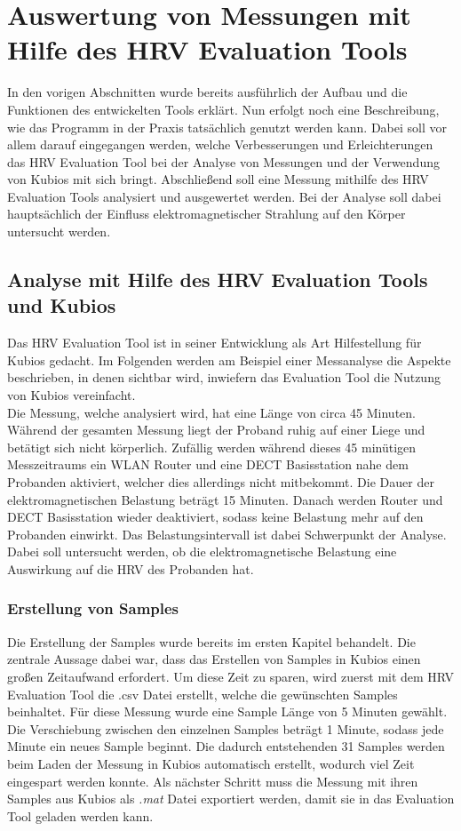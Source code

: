 
\chapter{Auswertung von Messungen mit Hilfe des HRV Evaluation Tools}
In den vorigen Abschnitten wurde bereits ausführlich der Aufbau und die Funktionen des entwickelten Tools erklärt. Nun erfolgt noch eine Beschreibung, wie das Programm in der Praxis tatsächlich genutzt werden kann. Dabei soll vor allem darauf eingegangen werden, welche Verbesserungen und Erleichterungen das HRV Evaluation Tool bei der Analyse von Messungen und der Verwendung von Kubios mit sich bringt. Abschließend soll eine Messung mithilfe des HRV Evaluation Tools analysiert und ausgewertet werden. Bei der Analyse soll dabei hauptsächlich der Einfluss elektromagnetischer Strahlung auf den Körper untersucht werden. 



\section{Analyse mit Hilfe des  HRV Evaluation Tools und Kubios}
Das HRV Evaluation Tool ist in seiner Entwicklung als Art Hilfestellung für Kubios gedacht. Im Folgenden werden am Beispiel einer Messanalyse die Aspekte beschrieben, in denen sichtbar wird, inwiefern das Evaluation Tool die Nutzung von Kubios vereinfacht.\\

Die Messung, welche analysiert wird, hat eine Länge von circa 45 Minuten. Während der gesamten Messung liegt der Proband ruhig auf einer Liege und betätigt sich nicht körperlich. Zufällig werden während dieses 45 minütigen Messzeitraums ein WLAN Router und eine DECT Basisstation nahe dem Probanden aktiviert, welcher dies allerdings nicht mitbekommt. Die Dauer der elektromagnetischen Belastung beträgt 15 Minuten. Danach werden Router und DECT Basisstation wieder deaktiviert, sodass keine Belastung mehr auf den Probanden einwirkt. Das Belastungsintervall ist dabei Schwerpunkt der Analyse. Dabei soll untersucht werden, ob die elektromagnetische Belastung eine Auswirkung auf die HRV des Probanden hat.

\subsection{Erstellung von Samples}
Die Erstellung der Samples wurde bereits im ersten Kapitel behandelt. Die zentrale Aussage dabei war, dass das Erstellen von Samples in Kubios einen großen Zeitaufwand erfordert. Um diese Zeit zu sparen, wird zuerst mit dem HRV Evaluation Tool  die .csv Datei erstellt, welche die gewünschten Samples beinhaltet.
Für diese Messung wurde eine Sample Länge von 5 Minuten gewählt. Die Verschiebung zwischen den einzelnen Samples beträgt 1 Minute, sodass jede Minute ein neues Sample beginnt. Die dadurch entstehenden 31 Samples werden beim Laden der Messung in Kubios automatisch erstellt, wodurch viel Zeit eingespart werden konnte. Als nächster Schritt muss die Messung mit ihren Samples aus Kubios als \textit{.mat} Datei exportiert werden, damit sie in das Evaluation Tool geladen werden kann. 

